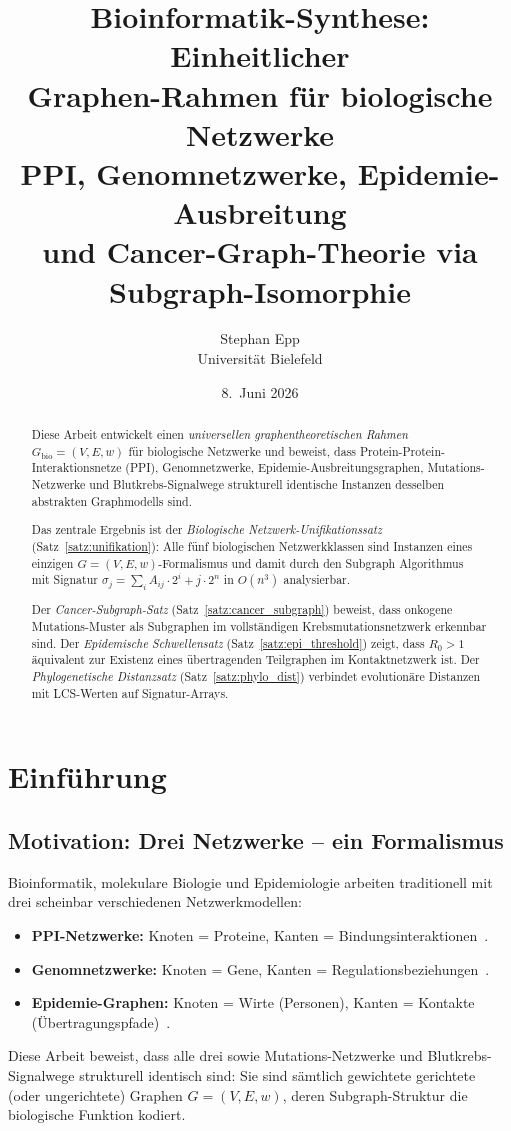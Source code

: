 ﻿\documentclass[a4paper,12pt]{article}
\title{Bioinformatik-Synthese: Einheitlicher\\
Graphen-Rahmen f\"ur biologische Netzwerke\\[6pt]
PPI, Genomnetzwerke, Epidemie-Ausbreitung\\
und Cancer-Graph-Theorie via Subgraph-Isomorphie}
\author{Stephan Epp\\[4pt]
\small Universit\"at Bielefeld}
\date{8.\ Juni 2026}
\theoremstyle{plain}
\theoremstyle{definition}
\theoremstyle{remark}
\newcommand{\Gbio}{G_{\mathrm{bio}}}
\begin{document}
\maketitle

\begin{abstract}
Diese Arbeit entwickelt einen \emph{universellen graphentheoretischen Rahmen}
$\Gbio = (V, E, w)$ f\"ur biologische Netzwerke und beweist, dass
Protein-Protein-Interaktionsnetze (PPI), Genomnetzwerke, Epidemie-Ausbreitungsgraphen,
Mutations-Netzwerke und Blutkrebs-Signalwege strukturell identische Instanzen
desselben abstrakten Graphmodells sind.

Das zentrale Ergebnis ist der \emph{Biologische Netzwerk-Unifikationssatz}
(Satz~\ref{satz:unifikation}): Alle f\"unf biologischen Netzwerkklassen sind
Instanzen eines einzigen $G=(V,E,w)$-Formalismus und damit durch den
Subgraph Algorithmus~\cite{epp2026subgraph} mit Signatur
$\sigma_j = \sum_i A_{ij}\cdot 2^i + j\cdot 2^n$ in $O(n^3)$ analysierbar.

Der \emph{Cancer-Subgraph-Satz} (Satz~\ref{satz:cancer_subgraph})
beweist, dass onkogene Mutations-Muster als Subgraphen im
vollst\"andigen Krebsmutationsnetzwerk erkennbar sind.
Der \emph{Epidemische Schwellensatz} (Satz~\ref{satz:epi_threshold})
zeigt, dass $R_0 > 1$ \"aquivalent zur Existenz eines
\"ubertragenden Teilgraphen im Kontaktnetzwerk ist.
Der \emph{Phylogenetische Distanzsatz} (Satz~\ref{satz:phylo_dist})
verbindet evolutionäre Distanzen mit LCS-Werten auf Signatur-Arrays.
\end{abstract}

\tableofcontents
\newpage

\section{Einf\"uhrung}

\subsection{Motivation: Drei Netzwerke -- ein Formalismus}

Bioinformatik, molekulare Biologie und Epidemiologie arbeiten traditionell
mit drei scheinbar verschiedenen Netzwerkmodellen:
\begin{itemize}
    \item \textbf{PPI-Netzwerke:} Knoten = Proteine,
          Kanten = Bindungsinteraktionen~\cite{barabasi2004}.
    \item \textbf{Genomnetzwerke:} Knoten = Gene,
          Kanten = Regulationsbeziehungen~\cite{alon2007}.
    \item \textbf{Epidemie-Graphen:} Knoten = Wirte (Personen),
          Kanten = Kontakte (\"Ubertragungspfade)~\cite{keeling2005}.
\end{itemize}
Diese Arbeit beweist, dass alle drei sowie Mutations-Netzwerke und
Blutkrebs-Signalwege strukturell identisch sind: Sie sind s\"amtlich
gewichtete gerichtete (oder ungerichtete) Graphen $G = (V, E, w)$,
deren Subgraph-Struktur die biologische Funktion kodiert.
\end{document}
